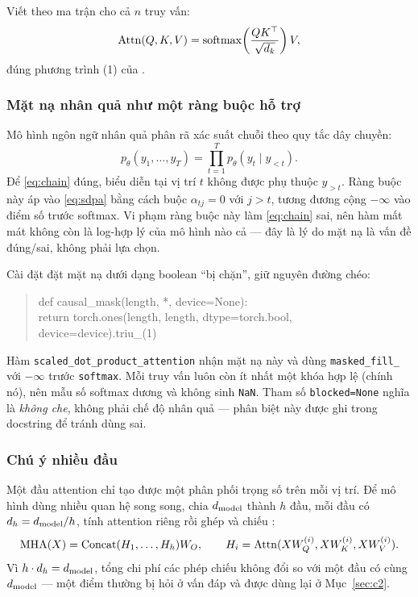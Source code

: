 Viết theo ma trận cho cả $n$ truy vấn:
\begin{equation}
  \operatorname{Attn}(Q,K,V)=\operatorname{softmax}\!\left(\frac{QK^\top}{\sqrt{d_k}}\right)V,
  \label{eq:sdpa}
\end{equation}
đúng phương trình (1) của \cite{attention}.

\subsubsection{Mặt nạ nhân quả như một ràng buộc hỗ trợ}

Mô hình ngôn ngữ nhân quả phân rã xác suất chuỗi theo quy tắc dây chuyền:
\begin{equation}
  p_\theta(y_1,\ldots,y_T)=\prod_{t=1}^{T}p_\theta(y_t\mid y_{<t}).
  \label{eq:chain}
\end{equation}
Để \eqref{eq:chain} đúng, biểu diễn tại vị trí $t$ không được phụ thuộc
$y_{>t}$. Ràng buộc này áp vào \eqref{eq:sdpa} bằng cách buộc $\alpha_{tj}=0$ với
$j>t$, tương đương cộng $-\infty$ vào điểm số trước softmax. Vi phạm ràng buộc này
làm \eqref{eq:chain} sai, nên hàm mất mát không còn là log-hợp lý của mô hình nào
cả --- đây là lý do mặt nạ là vấn đề đúng/sai, không phải lựa chọn.

Cài đặt đặt mặt nạ dưới dạng boolean ``bị chặn'', giữ nguyên đường chéo:

\begin{quote}\small\ttfamily
def causal\_mask(length, *, device=None):\\
\hspace*{2em}return torch.ones(length, length, dtype=torch.bool, device=device).triu\_(1)
\end{quote}

Hàm \texttt{scaled\_dot\_product\_attention} nhận mặt nạ này và dùng
\texttt{masked\_fill\_} với $-\infty$ trước \texttt{softmax}. Mỗi truy vấn luôn còn
ít nhất một khóa hợp lệ (chính nó), nên mẫu số softmax dương và không sinh
\texttt{NaN}. Tham số \texttt{blocked=None} nghĩa là \emph{không che}, không phải
chế độ nhân quả --- phân biệt này được ghi trong docstring để tránh dùng sai.

\subsubsection{Chú ý nhiều đầu}

Một đầu attention chỉ tạo được một phân phối trọng số trên mỗi vị trí. Để mô hình
dùng nhiều quan hệ song song, chia $d_{\mathrm{model}}$ thành $h$ đầu, mỗi đầu có
$d_h=d_{\mathrm{model}}/h$, tính attention riêng rồi ghép và chiếu
\cite[§3.2.2]{attention}:
\[
  \mathrm{MHA}(X)=\mathrm{Concat}(H_1,\ldots,H_h)W_O,\qquad
  H_i=\operatorname{Attn}(XW_Q^{(i)},XW_K^{(i)},XW_V^{(i)}).
\]
Vì $h\cdot d_h=d_{\mathrm{model}}$, tổng chi phí các phép chiếu không đổi so với một đầu có
cùng $d_{\mathrm{model}}$ --- một điểm thường bị hỏi ở vấn đáp và được dùng lại ở
Mục~\ref{sec:c2}.

